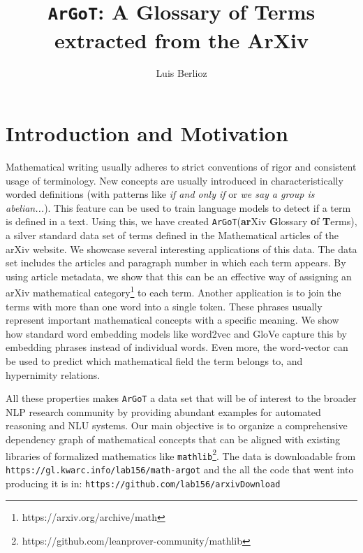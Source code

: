 \documentclass[submission,copyright,creativecommons]{eptcs}
\title{\texttt{ArGoT}: A Glossary of Terms extracted from the ArXiv}
\author{Luis Berlioz
    \institute{University of Pittsburgh\\
    Pennsylvania, USA}
\email{lab232@pitt.edu}
}
\newcommand{\argot}{\texttt{ArGoT}\xspace}
\begin{document}
\maketitle

\begin{abstract}
    
\end{abstract}

\section{Introduction and Motivation}
Mathematical writing usually adheres to strict conventions of rigor
and consistent usage of terminology.
New concepts are usually introduced in characteristically worded 
definitions (with patterns like \textit{if
    and only if} or \textit{we say a group is abelian...}). 
This feature can be used to train language models to detect if a term is defined in a text.
Using this, we have created \argot (\textbf{ar}Xiv \textbf{G}lossary \textbf{o}f \textbf{T}erms), a silver standard data set of terms defined in
the Mathematical articles of the arXiv website. 
We showcase several interesting applications of this data. The data set includes the articles and  paragraph number in which each term appears. By using article metadata, we show that this can be an effective way of assigning an arXiv mathematical category\footnote{https://arxiv.org/archive/math} to each term.
Another application is to join the terms with more than one word into a single token.
These phrases usually represent important mathematical concepts with a specific meaning.
We show how standard word embedding models like word2vec
\cite{word2vec} and GloVe \cite{pennington2014glove} capture this by embedding phrases instead of individual words.
Even more, the word-vector can be used to predict which mathematical field the term belongs to, and hypernimity relations.

All these properties  makes \argot  a data set that will be of
interest to the broader NLP research community by providing abundant
examples for automated reasoning and NLU systems. 
Our main objective is to organize a comprehensive dependency graph of mathematical concepts that can be aligned with existing libraries of formalized mathematics like \texttt{mathlib}\footnote{https://github.com/leanprover-community/mathlib}.
The data is downloadable from \texttt{https://gl.kwarc.info/lab156/math-argot} and the all the code that went
into producing it is in: \texttt{https://github.com/lab156/arxivDownload}
\end{document}
